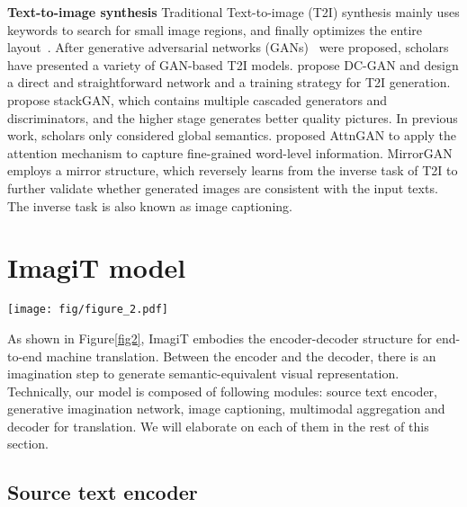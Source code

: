 \documentclass[11pt]{article}
\newcommand{\method}{ImagiT\xspace}
\begin{document}
\textbf{Text-to-image synthesis}   Traditional Text-to-image (T2I) synthesis mainly uses keywords to search for small image regions, and finally optimizes the entire layout~\cite{zhu2007text}. After generative adversarial networks (GANs)~\cite{goodfellow2014generative} were proposed, scholars have presented a variety of GAN-based T2I models. \citet{reed2016generative} propose DC-GAN and design a direct and straightforward network and a training strategy for T2I generation. \citet{zhang2017stackgan} propose stackGAN, which contains multiple cascaded generators and discriminators, and the higher stage generates better quality pictures. In previous work, scholars only considered global semantics. \citet{xu2018attngan} proposed AttnGAN to apply the attention mechanism to capture fine-grained word-level information. MirrorGAN~\cite{qiao2019mirrorgan} employs a mirror structure, which reversely learns from the inverse task of T2I to further validate whether generated images are consistent with the input texts. The inverse task is also known as image captioning. 
\section{ImagiT model}
\label{sec:method}
\begin{figure*}[t]
\centering
\texttt{[image: fig/figure\_2.pdf]} \caption{Overview of the framework of the proposed \method.  and  are text-to-image converters, sharing similar structures, comprising of perceptron, residual, and unsampling blocks. L represents L identical layers. Noting that we only need to obtain the generated visual feature to guide the translation, for the whole pipeline, up-sampling this feature to image is redundant.}
\label{fig2}
\end{figure*}

As shown in Figure\ref{fig2}, \method embodies the encoder-decoder structure for end-to-end machine translation. Between the encoder and the decoder, there is an imagination step to generate semantic-equivalent visual representation. Technically, our model is composed of following modules: source text encoder, generative imagination network, image captioning, multimodal aggregation and decoder for translation. We will elaborate on each of them in the rest of this section.

\subsection{Source text encoder}
\end{document}
